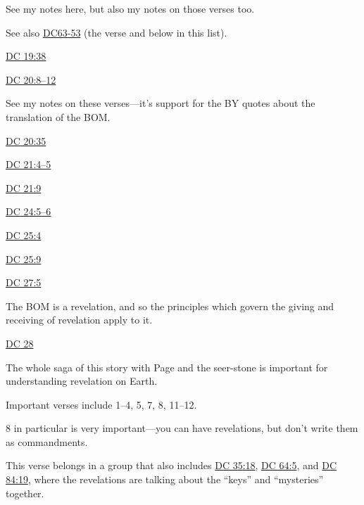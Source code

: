 \begin{compactdesc}
\begin{compactitem}
\begin{compactitem}
							\item See my notes here, but also my notes on those verses too.
							\item See also \hyperref[DC63-53]{DC63-53} (the verse and below in this list).
						\end{compactitem}
					\item \hyperref[DC19-38]{DC 19:38}
				\end{compactitem}
			\item \hyperref[DC20-8]{DC 20:8--12}
						\begin{compactitem}
							\item See my notes on these verses---it's support for the BY quotes about the translation of the BOM.
						\end{compactitem}
			\item \hyperref[DC20-35]{DC 20:35}
			\item \hyperref[DC21-4]{DC 21:4--5}
			\item \hyperref[DC21-9]{DC 21:9}
			\item \hyperref[DC24-5]{DC 24:5--6}
			\item \hyperref[DC25-4]{DC 25:4}
			\item \hyperref[DC25-9]{DC 25:9}
			\item \hyperref[DC27-5]{DC 27:5}
				\begin{compactitem}
					\item The BOM is a revelation, and so the principles which govern the giving and receiving of revelation apply to it.
				\end{compactitem}
			\item \hyperref[DC28]{DC 28}
				\begin{compactitem}
					\item The whole saga of this story with Page and the seer-stone is important for understanding revelation on Earth.
					\item Important verses include 1--4, 5, 7, 8, 11--12.
					\item 8 in particular is very important---you can have revelations, but don't write them as commandments.
					\item[{\hyperref[DC28-7]{DC 28:7}}]
						\begin{compactitem}
							\item This verse belongs in a group that also includes \hyperref[DC35-18]{DC 35:18}, \hyperref[DC64-5]{DC 64:5}, and \hyperref[DC84:19]{DC 84:19}, where the revelations are talking about the ``keys'' and ``mysteries'' together.

\end{compactitem}
\end{compactitem}
\end{compactdesc}
